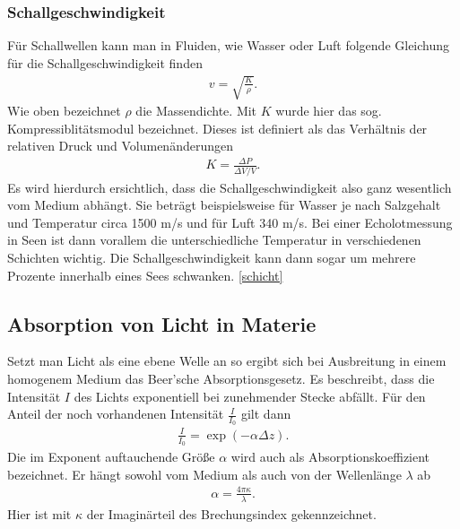 \documentclass[12pt,a4paper,titlepage,headinclude,bibtotoc]{scrartcl}
\begin{document}
\subsubsection{Schallgeschwindigkeit}
\label{sec:theschallgeschw}
Für Schallwellen kann man in Fluiden, wie Wasser oder Luft folgende Gleichung für die Schallgeschwindigkeit finden
\begin{align}
 v = \sqrt{  \frac{K}{\rho}  }.
\end{align}
Wie oben bezeichnet $\rho$ die Massendichte. Mit $K$ wurde hier das sog. Kompressiblitätsmodul bezeichnet. Dieses ist definiert als das Verhältnis der relativen Druck und Volumenänderungen \cite{tipler}
\begin{align}
 K =  \frac{\Delta P}{\Delta V / V }.
\end{align}
Es wird hierdurch ersichtlich, dass die Schallgeschwindigkeit also ganz wesentlich vom Medium abhängt. 
Sie beträgt beispielsweise für Wasser je nach Salzgehalt und Temperatur circa 1500 m/s  und für Luft 340 m/s.
Bei einer Echolotmessung in Seen ist dann vorallem die unterschiedliche Temperatur in verschiedenen Schichten 
wichtig. Die Schallgeschwindigkeit kann dann sogar um mehrere Prozente innerhalb eines Sees schwanken.
\ref{schicht} %



\subsection{Absorption von Licht in Materie}
Setzt man Licht als eine ebene Welle an so ergibt sich bei Ausbreitung in einem homogenem Medium das Beer'sche Absorptionsgesetz.
Es beschreibt, dass die Intensität $I$ des Lichts exponentiell bei zunehmender Stecke abfällt.
Für den Anteil der noch vorhandenen Intensität $\frac{I}{I_0}$ gilt dann
\begin{align}
 \frac{I}{I_0}  =  \exp(- \alpha  \Delta z).
\end{align}
Die im Exponent auftauchende Größe $\alpha$ wird auch als Absorptionskoeffizient bezeichnet. Er hängt sowohl vom Medium als auch von der Wellenlänge $\lambda$ ab
\begin{align}
 \alpha= \frac{4 \pi \kappa}{\lambda}.
\end{align}
Hier ist mit $\kappa$ der Imaginärteil des Brechungsindex gekennzeichnet.
\cite[S.229]{meschede}
\end{document}
